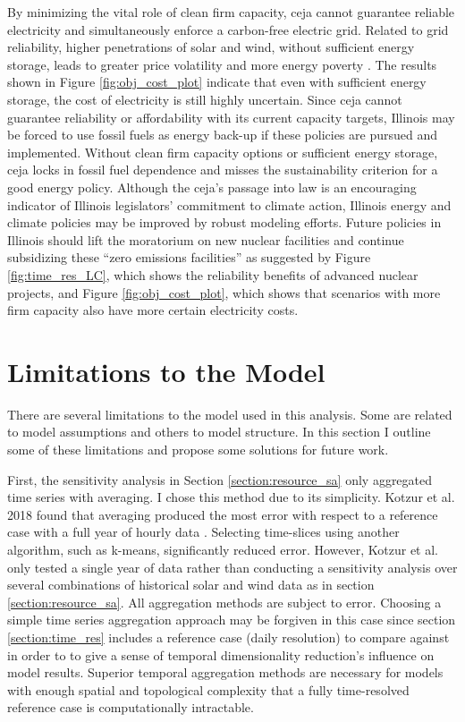 By minimizing the vital role of clean firm capacity, \gls{ceja} cannot guarantee
reliable electricity and simultaneously enforce a carbon-free electric grid. Related to grid
reliability, higher penetrations of solar and wind, without sufficient energy
storage, leads to greater price volatility \cite{winkler_impact_2016, blazquez_renewable_2018}
and more energy poverty \cite{henry_how_2021}. The results shown in Figure
\ref{fig:obj_cost_plot} indicate that even with sufficient energy storage, the cost
of electricity is still highly uncertain. Since
\gls{ceja} cannot guarantee reliability or affordability with its current capacity
targets, Illinois may be forced to use fossil fuels as energy back-up if these
policies are pursued and implemented. Without
clean firm capacity options or sufficient energy storage, \gls{ceja} locks in
fossil fuel dependence and misses the sustainability criterion for a good energy policy.
Although the \gls{ceja}'s passage into law is an encouraging indicator of Illinois
legislators' commitment to climate action, Illinois energy and climate policies
may be improved by robust modeling efforts. Future
policies in Illinois should lift the moratorium on new nuclear facilities and
continue subsidizing these ``zero emissions facilities'' as suggested by Figure
\ref{fig:time_res_LC}, which shows the reliability benefits of advanced nuclear
projects, and Figure \ref{fig:obj_cost_plot}, which shows that scenarios with
more firm capacity also have more certain electricity costs.

\section{Limitations to the Model}

There are several limitations to the model used in this analysis. Some are related
to model assumptions and others to model structure. In this section I outline some
of these limitations and propose some solutions for future work.

First, the sensitivity analysis in Section \ref{section:resource_sa} only aggregated
time series with averaging. I chose this method due to its simplicity. Kotzur
et al. 2018 found that averaging produced the most error with respect to a
reference case with a full year of
hourly data \cite{kotzur_impact_2018}. Selecting time-slices using another algorithm,
such as k-means, significantly reduced error. However, Kotzur et al. only tested a single
year of data rather than conducting a sensitivity analysis over several combinations
of historical solar and wind data as in section
\ref{section:resource_sa}. All aggregation methods are subject to error. Choosing
a simple time series aggregation approach may be forgiven in this case since section
\ref{section:time_res} includes a reference case (daily resolution) to compare against
in order to to give a sense of temporal dimensionality reduction's influence on model
results. Superior temporal aggregation methods are necessary for models with enough
spatial and topological complexity that a fully time-resolved reference case is
computationally intractable.

